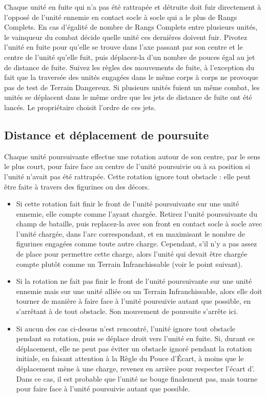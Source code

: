 Chaque unité en fuite qui n'a pas été rattrapée et détruite doit fuir directement à l'opposé de l'unité ennemie en contact socle à socle qui a le plus de Rangs Complets. En cas d'égalité de nombre de Rangs Complets entre plusieurs unités, le vainqueur du combat décide quelle unité ces dernières doivent fuir. Pivotez l'unité en fuite pour qu'elle se trouve dans l'axe passant par son centre et le centre de l'unité qu'elle fuit, puis déplacez-la d'un nombre de pouces égal au jet de distance de fuite. Suivez les règles des mouvements de fuite, à l'exception du fait que la traversée des unités engagées dans le même corps à corps ne provoque pas de test de Terrain Dangereux. Si plusieurs unités fuient un même combat, les unités se déplacent dans le même ordre que les jets de distance de fuite ont été lancés. Le propriétaire choisit l'ordre de ces jets.

\subsection{Distance et déplacement de poursuite}
\label{pursuit_distance_and_pursuing_units}

Chaque unité poursuivante effectue une rotation autour de son centre, par le sens le plus court, pour faire face au centre de l'unité poursuivie ou à sa position si l'unité n'avait pas été rattrapée. Cette rotation ignore tout obstacle : elle peut être faite à travers des figurines ou des décors.
\begin{itemize}[label={\textbullet}]

\item Si cette rotation fait finir le front de l'unité poursuivante sur une unité ennemie, elle compte comme l'ayant chargée. Retirez l'unité poursuivante du champ de bataille, puis replacez-la avec son front en contact socle à socle avec l'unité chargée, dans l'arc correspondant, et en maximisant le nombre de figurines engagées comme toute autre charge. Cependant, s'il n'y a pas assez de place pour permettre cette charge, alors l'unité qui devait être chargée compte plutôt comme un Terrain Infranchissable (voir le point suivant).
\item Si la rotation ne fait pas finir le front de l'unité poursuivante sur une unité ennemie mais sur une unité alliée ou un Terrain Infranchissable, alors elle doit tourner de manière à faire face à l'unité poursuivie autant que possible, en s'arrêtant à  de tout obstacle. Son mouvement de poursuite s'arrête ici.
\item Si aucun des cas ci-dessus n'est rencontré, l'unité ignore tout obstacle pendant sa rotation, puis se déplace droit vers l'unité en fuite. Si, durant ce déplacement, elle ne peut pas éviter un obstacle ignoré pendant la rotation initiale, en faisant attention à la Règle du Pouce d'Écart, à moins que le déplacement mène à une charge, revenez en arrière pour respecter l'écart d'. Dans ce cas, il est probable que l'unité ne bouge finalement pas, mais tourne pour faire face à l'unité poursuivie autant que possible.
\end{itemize}

